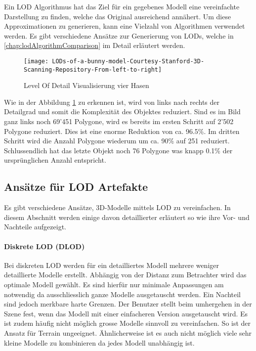 Ein LOD Algorithmus hat das Ziel für ein gegebenes Modell eine vereinfachte Darstellung zu finden, welche das Original ausreichend annähert. Um diese Approximationen zu generieren, kann eine Vielzahl von Algorithmen verwendet werden. Es gibt verschiedene Ansätze zur Generierung von LODs, welche in \autoref{chap:lodAlgorithmComparison} im Detail erläutert werden.

\begin{figure}[H]
\centering
\texttt{[image: LODs-of-a-bunny-model-Courtesy-Stanford-3D-Scanning-Repository-From-left-to-right]}
\caption{Level Of Detail Visualisierung vier Hasen}
\label{fig:LevelOfDetailVisualisierungvierHasen}
\end{figure}

Wie in der Abbildung \ref{fig:LevelOfDetailVisualisierungvierHasen} zu erkennen ist, wird von links nach rechts der Detailgrad und somit die Komplexität des Objektes reduziert. Sind es im Bild ganz links noch 69'451 Polygone, wird es bereits im ersten Schritt auf 2'502 Polygone reduziert. Dies ist eine enorme Reduktion von ca. 96.5\%. Im dritten Schritt wird die Anzahl Polygone wiederum um ca. 90\% auf 251 reduziert. Schlussendlich hat das letzte Objekt noch 76 Polygone was knapp 0.1\% der ursprünglichen Anzahl entspricht.

\subsection{Ansätze für LOD Artefakte}
\label{chap:differentLodApproaches}
Es gibt verschiedene Ansätze, 3D-Modelle mittels LOD zu vereinfachen. In diesem Abschnitt werden einige davon detaillierter erläutert so wie ihre Vor- und Nachteile aufgezeigt.

\paragraph{Diskrete LOD (DLOD)}
Bei diskreten LOD werden für ein detailliertes Modell mehrere weniger detaillierte Modelle erstellt.
Abhängig von der Distanz zum Betrachter wird das optimale Modell gewählt. Es sind hierfür nur minimale Anpassungen am  notwendig da ausschliesslich ganze Modelle ausgetauscht werden.
Ein Nachteil sind jedoch merkbare harte Grenzen. Der Benutzer stellt beim umhergehen in der Szene fest, wenn das Modell mit einer einfacheren Version ausgetauscht wird.
Es ist zudem häufig nicht möglich grosse Modelle sinnvoll zu vereinfachen. So ist der Ansatz für Terrain ungeeignet. Ähnlicherweise ist es auch nicht möglich viele sehr kleine Modelle zu kombinieren da jedes Modell unabhängig ist.

